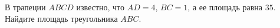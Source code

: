 \begin{ex}
	\begin{condition}
		В трапеции \( ABCD \) известно, что \( AD=4 \), \( BC=1 \), а ее площадь равна \( 35 \). Найдите площадь треугольника \( ABC \).
	\end{condition}
\end{ex}